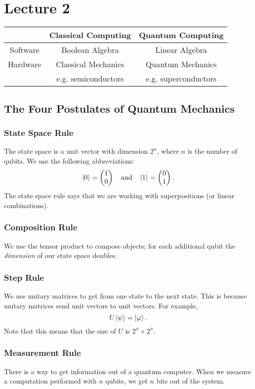 \documentclass[class=article, crop=false]{standalone}
\begin{document}
  \section{Lecture 2}
  \begin{center}
    \begin{tabular}{c|c|c}
      & Classical Computing & Quantum Computing \\
      \hline
      Software & Boolean Algebra & Linear Algebra \\
      \hline
      Hardware & Classical Mechanics & Quantum Mechanics \\
      & e.g. semiconductors & e.g. superconductors
    \end{tabular}
  \end{center}
  \subsection{The Four Postulates of Quantum Mechanics}
  \subsubsection{State Space Rule}
  The state space is a unit vector with dimension $2^n$, where $n$ is the number of qubits. We use the following abbreviations:
  \[
    \left\lvert 0 \right\rangle = \begin{pmatrix}
      1 \\
      0
    \end{pmatrix}\quad\text{and}\quad \left\lvert 1 \right\rangle = \begin{pmatrix}
      0 \\
      1
    \end{pmatrix}.
  \]
  The state space rule says that we are working with superpositions (or linear combinations).
  \subsubsection{Composition Rule}
  We use the tensor product to compose objects; for each additional qubit the \emph{dimension} of our state space doubles.
  \subsubsection{Step Rule}
  We use unitary matrices to get from one state to the next state. This is because unitary matrices send unit vectors to unit vectors. For example,
  \[
    U\left\lvert \psi \right\rangle = \left\lvert \varphi \right\rangle.
  \]
  Note that this means that the size of $U$ is $2^n\times 2^n$.
  \subsubsection{Measurement Rule}
  There is a way to get information out of a quantum computer. When we measure a computation performed with $n$ qubits, we get $n$ bits out of the system.
\end{document}
